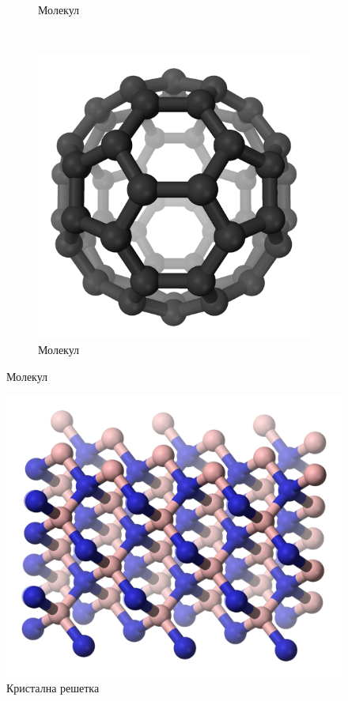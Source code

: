 \documentclass{report}
\theoremstyle{plain}
\theoremstyle{definition}
\begin{document}
\begin{figure}[h]
\begin{subfigure}{0.3\textwidth}
\caption{Молекул}
\end{subfigure}
~
\begin{subfigure}{0.3\textwidth}
\includegraphics[width=\textwidth]{molekul2}
\caption{Молекул}
\end{subfigure}
\end{figure}

\begin{figure}[h]
\centering
\includegraphics[width=\textwidth]{resetka}
\caption{Кристална решетка}
\end{figure}
\end{document}
